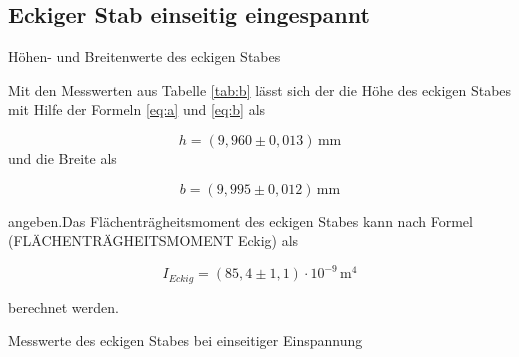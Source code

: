 \subsection{Eckiger Stab einseitig eingespannt}

\begin{table}[H]
  \centering
  
  
  \caption{Höhen- und Breitenwerte des eckigen Stabes}
  \label{tab:c}
\end{table}

Mit den Messwerten aus Tabelle \ref{tab:b} lässt sich
der die Höhe des eckigen Stabes mit Hilfe der Formeln
\ref{eq:a} und \ref{eq:b} als 

\begin{equation*}
  h=(9,960 \pm 0,013)\,\si{\milli\meter}
\end{equation*}
\noindent und die Breite als

\begin{equation*}
  b=(9,995 \pm 0,012)\,\si{\milli\meter}
\end{equation*}

\noindent angeben.Das Flächenträgheitsmoment des eckigen Stabes kann nach Formel (FLÄCHENTRÄGHEITSMOMENT Eckig)
als

\begin{equation*}
  I_{Eckig}=(85,4 \pm 1,1)\cdot 10^{-9}\,\si{\meter \tothe{4}}
\end{equation*}

\noindent berechnet werden. 

\begin{table}[H]
  \centering
  
  
  \caption{Messwerte des eckigen Stabes bei einseitiger Einspannung}
  \label{tab:d}
\end{table}


